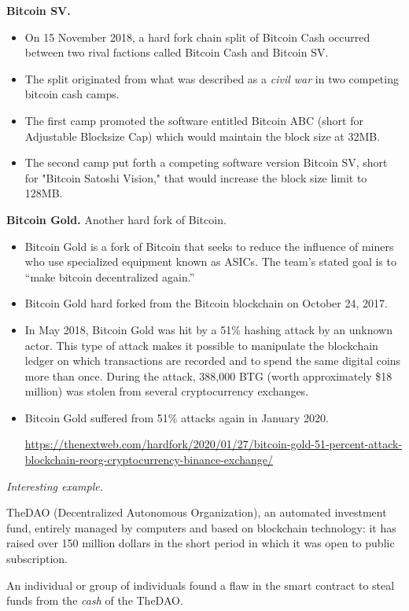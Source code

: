 \textbf{Bitcoin SV.}
\begin{itemize}
	\item On 15 November 2018, a hard fork chain split of Bitcoin Cash occurred between two rival factions called Bitcoin Cash and Bitcoin SV.
	\item The split originated from what was described as a \textit{civil war} in two competing bitcoin cash camps.
	\item The first camp promoted the software entitled Bitcoin ABC (short for Adjustable Blocksize Cap) which would maintain the block size at 32MB.
	\item The second camp put forth a competing software version Bitcoin SV, short for "Bitcoin Satoshi Vision," that would increase the block size limit to 128MB.
\end{itemize}

\textbf{Bitcoin Gold. }Another hard fork of Bitcoin.
\begin{itemize}
	\item Bitcoin Gold is a fork of Bitcoin that seeks to reduce the influence of miners who use specialized equipment known as ASICs. The team’s stated goal is to ``make bitcoin decentralized again.''
	\item Bitcoin Gold hard forked from the Bitcoin blockchain on October 24, 2017.
	\item In May 2018, Bitcoin Gold was hit by a 51\% hashing attack by an unknown actor. This type of attack makes it possible to manipulate the blockchain ledger on which transactions are recorded and to spend the same digital coins more than once. During the attack, 388,000 BTG (worth approximately \$18 million) was stolen from several cryptocurrency exchanges. 
	\item Bitcoin Gold suffered from 51\% attacks again in January 2020.
	      
	      \url{https://thenextweb.com/hardfork/2020/01/27/bitcoin-gold-51-percent-attack-blockchain-reorg-cryptocurrency-binance-exchange/}
\end{itemize}

\textit{Interesting example.}

TheDAO (Decentralized Autonomous Organization), an automated investment fund, entirely managed by computers and based on blockchain technology: it has raised over 150 million dollars in the short period in which it was open to public subscription.

An individual or group of individuals found a flaw in the smart contract to steal funds from the \textit{cash} of the TheDAO.

